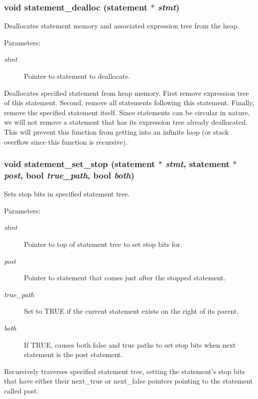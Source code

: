 \subsubsection{\setlength{\rightskip}{0pt plus 5cm}void statement\_\-dealloc ({\bf statement} $\ast$ {\em stmt})}\label{statement_8c_a9}


Deallocates statement memory and associated expression tree from the heap.

\begin{Desc}
\item[Parameters: ]\par
\begin{description}
\item[{\em 
stmt}]Pointer to statement to deallocate.\end{description}
\end{Desc}
Deallocates specified statement from heap memory. First remove expression tree of this statement. Second, remove all statements following this statement. Finally, remove the specified statement itself. Since statements can be circular in nature, we will not remove a statement that has its expression tree already deallocated. This will prevent this function from getting into an infinite loop (or stack overflow since this function is recursive). 
\subsubsection{\setlength{\rightskip}{0pt plus 5cm}void statement\_\-set\_\-stop ({\bf statement} $\ast$ {\em stmt}, {\bf statement} $\ast$ {\em post}, {\bf bool} {\em true\_\-path}, {\bf bool} {\em both})}\label{statement_8c_a8}


Sets stop bits in specified statement tree.

\begin{Desc}
\item[Parameters: ]\par
\begin{description}
\item[{\em 
stmt}]Pointer to top of statement tree to set stop bits for. \item[{\em 
post}]Pointer to statement that comes just after the stopped statement. \item[{\em 
true\_\-path}]Set to TRUE if the current statement exists on the right of its parent. \item[{\em 
both}]If TRUE, causes both false and true paths to set stop bits when next statement is the post statement.\end{description}
\end{Desc}
Recursively traverses specified statement tree, setting the statement's stop bits that have either their next\_\-true or next\_\-false pointers pointing to the statement called post. 
